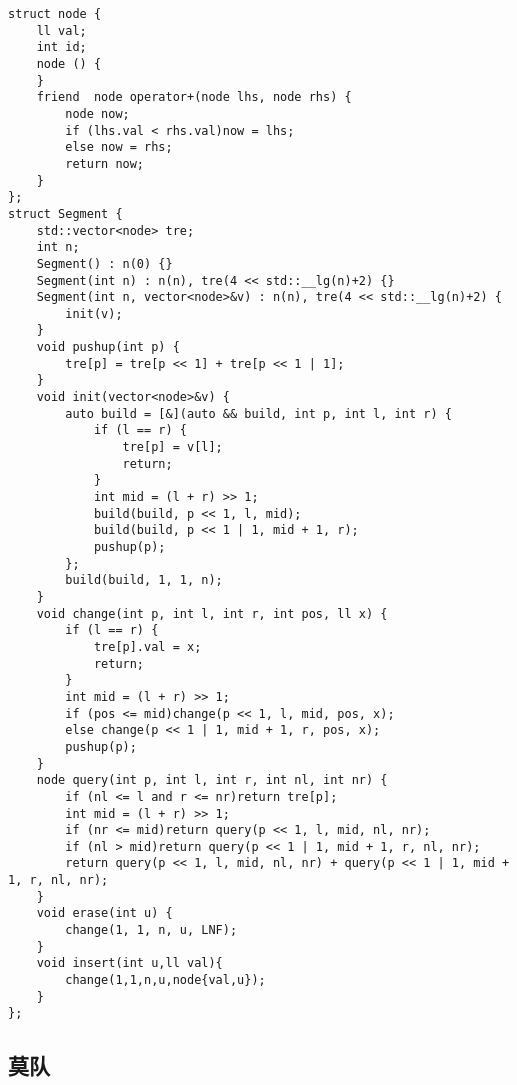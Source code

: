 \documentclass[a4paper,10pt]{article}
\begin{document}
\noindent\begin{lstlisting}
struct node {
    ll val;
    int id;
    node () {
    }
    friend  node operator+(node lhs, node rhs) {
        node now;
        if (lhs.val < rhs.val)now = lhs;
        else now = rhs;
        return now;
    }
};
struct Segment {
    std::vector<node> tre;
    int n;
    Segment() : n(0) {}
    Segment(int n) : n(n), tre(4 << std::__lg(n)+2) {}
    Segment(int n, vector<node>&v) : n(n), tre(4 << std::__lg(n)+2) {
        init(v);
    }
    void pushup(int p) {
        tre[p] = tre[p << 1] + tre[p << 1 | 1];
    }
    void init(vector<node>&v) {
        auto build = [&](auto && build, int p, int l, int r) {
            if (l == r) {
                tre[p] = v[l];
                return;
            }
            int mid = (l + r) >> 1;
            build(build, p << 1, l, mid);
            build(build, p << 1 | 1, mid + 1, r);
            pushup(p);
        };
        build(build, 1, 1, n);
    }
    void change(int p, int l, int r, int pos, ll x) {
        if (l == r) {
            tre[p].val = x;
            return;
        }
        int mid = (l + r) >> 1;
        if (pos <= mid)change(p << 1, l, mid, pos, x);
        else change(p << 1 | 1, mid + 1, r, pos, x);
        pushup(p);
    }
    node query(int p, int l, int r, int nl, int nr) {
        if (nl <= l and r <= nr)return tre[p];
        int mid = (l + r) >> 1;
        if (nr <= mid)return query(p << 1, l, mid, nl, nr);
        if (nl > mid)return query(p << 1 | 1, mid + 1, r, nl, nr);
        return query(p << 1, l, mid, nl, nr) + query(p << 1 | 1, mid + 1, r, nl, nr);
    }
    void erase(int u) {
        change(1, 1, n, u, LNF);
    }
    void insert(int u,ll val){
        change(1,1,n,u,node{val,u});
    }
};\end{lstlisting}

\subsection{莫队}
\thispagestyle{fancy}
\end{document}

